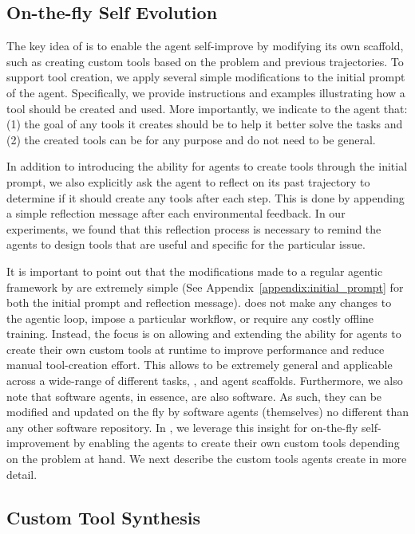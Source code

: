 \subsection{On-the-fly Self Evolution}

The key idea of \tech is to enable the agent self-improve by modifying its{ own scaffold}{, such as} creating custom tools based on the problem and previous trajectories.
To support tool creation, we apply several simple modifications to the initial prompt of the agent.
Specifically, we provide instructions and examples illustrating how a tool should be created and used.
More importantly, we indicate to the agent that: (1) the goal of any tools it creates should be to help it better solve the tasks and (2) the created tools can be for any purpose and do not need to be general. 

In addition to introducing the ability for agents to create tools through the initial prompt, we also explicitly ask the agent to reflect on its past trajectory to determine if it should create any tools after each step. 
This is done by appending a simple reflection message after each environmental feedback.
In our experiments, we found that this reflection process is necessary to remind the agents to design tools that are useful and specific for the particular issue.

It is important to point out that the modifications made to a regular agentic framework by \tech are extremely simple (See Appendix~\ref{appendix:initial_prompt} for both the initial prompt and reflection message).
\tech does not make any changes to the agentic loop, impose a particular workflow, or require any costly offline training.
Instead, the focus is on allowing and extending the ability for agents to create their own custom tools at runtime to improve performance and reduce manual tool-creation effort.
This allows \tech to be extremely general and applicable across a wide-range of different tasks, , and agent scaffolds. 
Furthermore, we also note that software agents, in essence, are also software.
As such, they can be modified and updated on the fly by software agents (themselves) no different than any other software repository.
In \tech, we leverage this insight for on-the-fly self-improvement by enabling the agents to create their own custom tools depending on the problem at hand.
We next describe the custom tools agents create in more detail.


\subsection{Custom Tool Synthesis}

